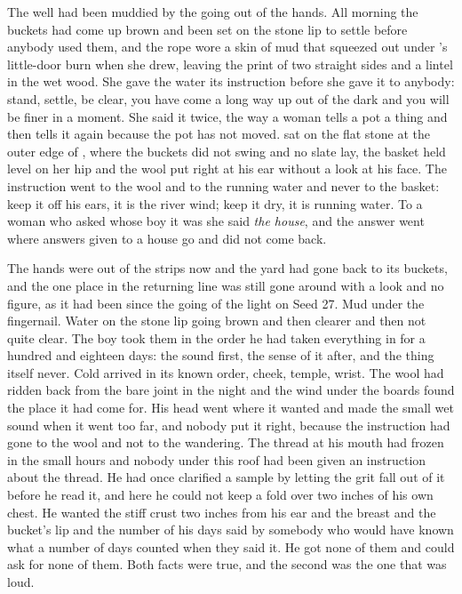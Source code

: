 
The well had been muddied by the going out of the hands. All morning the buckets had come up brown and been set on the stone lip to settle before anybody used them, and the rope wore a skin of mud that squeezed out under 's little-door burn when she drew, leaving the print of two straight sides and a lintel in the wet wood. She gave the water its instruction before she gave it to anybody: stand, settle, be clear, you have come a long way up out of the dark and you will be finer in a moment. She said it twice, the way a woman tells a pot a thing and then tells it again because the pot has not moved.  sat on the flat stone at the outer edge of , where the buckets did not swing and no slate lay, the basket held level on her hip and the wool put right at his ear without a look at his face. The instruction went to the wool and to the running water and never to the basket: keep it off his ears, it is the river wind; keep it dry, it is running water. To a woman who asked whose boy it was she said \emph{the house}, and the answer went where answers given to a house go and did not come back.

The hands were out of the strips now and the yard had gone back to its buckets, and the one place in the returning line was still gone around with a look and no figure, as it had been since the going of the light on Seed 27. Mud under the fingernail. Water on the stone lip going brown and then clearer and then not quite clear. The boy took them in the order he had taken everything in for a hundred and eighteen days: the sound first, the sense of it after, and the thing itself never. Cold arrived in its known order, cheek, temple, wrist. The wool had ridden back from the bare joint in the night and the wind under the boards found the place it had come for. His head went where it wanted and made the small wet sound when it went too far, and nobody put it right, because the instruction had gone to the wool and not to the wandering. The thread at his mouth had frozen in the small hours and nobody under this roof had been given an instruction about the thread. He had once clarified a sample by letting the grit fall out of it before he read it, and here he could not keep a fold over two inches of his own chest. He wanted the stiff crust two inches from his ear and the breast and the bucket's lip and the number of his days said by somebody who would have known what a number of days counted when they said it. He got none of them and could ask for none of them. Both facts were true, and the second was the one that was loud.

